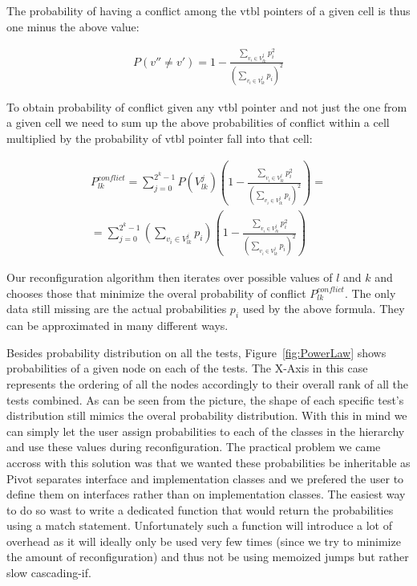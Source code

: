 \documentclass[preprint]{sigplanconf}
\begin{document}
The probability of having a conflict among the vtbl pointers of a given cell is 
thus one minus the above value:

\begin{eqnarray*}
P(v''\neq v')=1-\frac{\sum\limits_{v_i \in V^j_{lk}}p_i^2}{(\sum\limits_{v_{i} \in V^j_{lk}}p_{i})^2}
\end{eqnarray*}

To obtain probability of conflict given any vtbl pointer and not just the one 
from a given cell we need to sum up the above probabilities of conflict within a 
cell multiplied by the probability of vtbl pointer fall into that cell:

\begin{eqnarray*}
P_{lk}^{conflict}=\sum\limits_{j=0}^{2^k-1}P(V^j_{lk})(1-\frac{\sum\limits_{v_i \in V^j_{lk}}p_i^2}{(\sum\limits_{v_{i} \in V^j_{lk}}p_{i})^2})=\\
=\sum\limits_{j=0}^{2^k-1}(\sum\limits_{v_{i} \in V^j_{lk}}p_{i})(1-\frac{\sum\limits_{v_i \in V^j_{lk}}p_i^2}{(\sum\limits_{v_{i} \in V^j_{lk}}p_{i})^2})
\end{eqnarray*}

Our reconfiguration algorithm then iterates over possible values of $l$ and $k$ 
and chooses those that minimize the overal probability of conflict $P_{lk}^{conflict}$.
The only data still missing are the actual probabilities $p_i$ used by the above 
formula. They can be approximated in many different ways.

Besides probability distribution on all the tests, Figure~\ref{fig:PowerLaw} 
shows probabilities of a given node on each of the tests. The X-Axis in this 
case represents the ordering of all the nodes accordingly to their overall rank 
of all the tests combined. As can be seen from the picture, the shape of each 
specific test's distribution still mimics the overal probability distribution. 
With this in mind we can simply let the user assign probabilities to each of the 
classes in the hierarchy and use these values during reconfiguration. The 
practical problem we came accross with this solution was that we wanted these 
probabilities be inheritable as Pivot separates interface and implementation 
classes and we prefered the user to define them on interfaces rather than on 
implementation classes. The easiest way to do so wast to write a dedicated 
function that would return the probabilities using a match statement. 
Unfortunately such a function will introduce a lot of overhead as it will 
ideally only be used very few times (since we try to minimize the amount of 
reconfiguration) and thus not be using memoized jumps but rather slow 
cascading-if.
\end{document}
